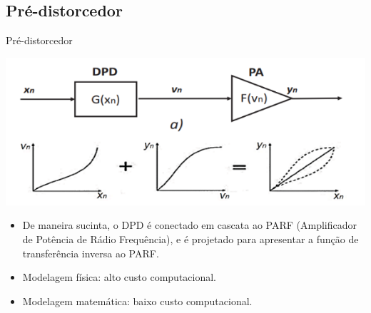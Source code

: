 \documentclass{if-beamer}
\begin{document}
\subsection{Pré-distorcedor}
\begin{frame}{Pré-distorcedor}
\begin{minipage}{0.5\textwidth}
		
		\includegraphics[scale=0.5]{DPDCascata.png}
		
	\end{minipage}%
	\hspace{0.04\textwidth}
	\begin{minipage}{0.5\textwidth}
		\begin{itemize}
			\item De maneira sucinta, o DPD é conectado em cascata ao PARF (Amplificador de Potência de Rádio Frequência), e é projetado para apresentar a função de transferência inversa ao PARF.
			\item Modelagem física: alto custo computacional.
			\item Modelagem matemática: baixo custo computacional.
		\end{itemize}
	\end{minipage}
\end{frame}
\end{document}
